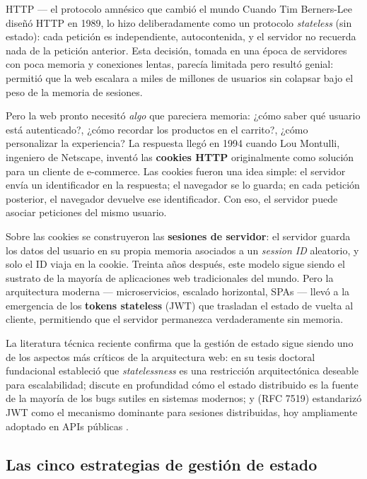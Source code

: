 \documentclass[11pt,a4paper,openany]{book}
\begin{document}
\begin{cajahistoria}{HTTP --- el protocolo amnésico que cambió el mundo}
Cuando Tim Berners-Lee diseñó HTTP en 1989, lo hizo deliberadamente
como un protocolo \emph{stateless} (sin estado): cada petición es
independiente, autocontenida, y el servidor no recuerda nada de la
petición anterior. Esta decisión, tomada en una época de servidores
con poca memoria y conexiones lentas, parecía limitada pero resultó
genial: permitió que la web escalara a miles de millones de usuarios
sin colapsar bajo el peso de la memoria de sesiones.

Pero la web pronto necesitó \emph{algo} que pareciera memoria: ¿cómo
saber qué usuario está autenticado?, ¿cómo recordar los productos en
el carrito?, ¿cómo personalizar la experiencia? La respuesta llegó en
1994 cuando Lou Montulli, ingeniero de Netscape, inventó las
\textbf{cookies HTTP} originalmente como solución para un cliente de
e-commerce. Las cookies fueron una idea simple: el servidor envía un
identificador en la respuesta; el navegador se lo guarda; en cada
petición posterior, el navegador devuelve ese identificador. Con eso,
el servidor puede asociar peticiones del mismo usuario.

Sobre las cookies se construyeron las \textbf{sesiones de servidor}:
el servidor guarda los datos del usuario en su propia memoria
asociados a un \emph{session ID} aleatorio, y solo el ID viaja en la
cookie. Treinta años después, este modelo sigue siendo el sustrato de
la mayoría de aplicaciones web tradicionales del mundo. Pero la
arquitectura moderna --- microservicios, escalado horizontal, SPAs
--- llevó a la emergencia de los \textbf{tokens stateless} (JWT) que
trasladan el estado de vuelta al cliente, permitiendo que el servidor
permanezca verdaderamente sin memoria.

La literatura técnica reciente confirma que la gestión de estado sigue
siendo uno de los aspectos más críticos de la arquitectura web:
\cite{fielding2000rest} en su tesis doctoral fundacional estableció
que \emph{statelessness} es una restricción arquitectónica deseable
para escalabilidad; \cite{kleppmann2017designing} discute en
profundidad cómo el estado distribuido es la fuente de la mayoría de
los bugs sutiles en sistemas modernos; y
\cite{jones2015jwt} (RFC 7519) estandarizó JWT como el mecanismo
dominante para sesiones distribuidas, hoy ampliamente adoptado en
APIs públicas \cite{jones2015jwt}.
\end{cajahistoria}

\subsection{Las cinco estrategias de gestión de estado}
\end{document}
